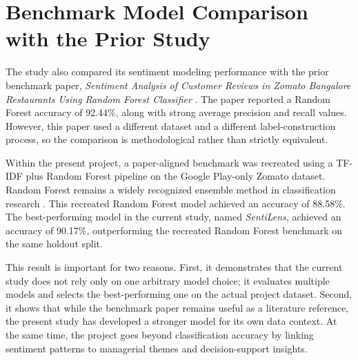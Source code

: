 
\section{Benchmark Model Comparison with the Prior Study}

The study also compared its sentiment modeling performance with the prior benchmark paper, \textit{Sentiment Analysis of Customer Reviews in Zomato Bangalore Restaurants Using Random Forest Classifier} \cite{jonathan2019}. The paper reported a Random Forest accuracy of 92.44\%, along with strong average precision and recall values. However, this paper used a different dataset and a different label-construction process, so the comparison is methodological rather than strictly equivalent.

Within the present project, a paper-aligned benchmark was recreated using a TF-IDF plus Random Forest pipeline on the Google Play-only Zomato dataset. Random Forest remains a widely recognized ensemble method in classification research \cite{breiman2001}. This recreated Random Forest model achieved an accuracy of 88.58\%. The best-performing model in the current study, named \textit{SentiLens}, achieved an accuracy of 90.17\%, outperforming the recreated Random Forest benchmark on the same holdout split.

This result is important for two reasons. First, it demonstrates that the current study does not rely only on one arbitrary model choice; it evaluates multiple models and selects the best-performing one on the actual project dataset. Second, it shows that while the benchmark paper remains useful as a literature reference, the present study has developed a stronger model for its own data context. At the same time, the project goes beyond classification accuracy by linking sentiment patterns to managerial themes and decision-support insights.

